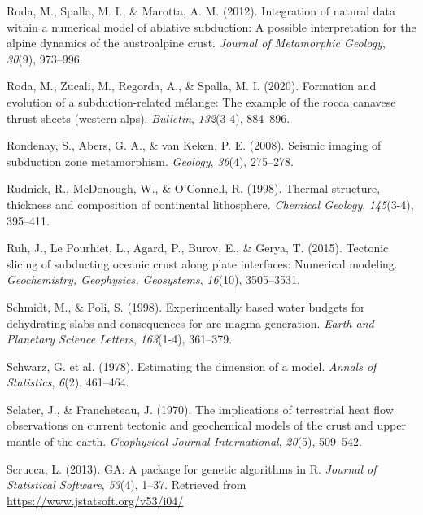 \begin{CSLReferences}{1}{1}
\leavevmode{}%
Roda, M., Spalla, M. I., \& Marotta, A. M. (2012). Integration of natural data within a numerical model of ablative subduction: A possible interpretation for the alpine dynamics of the austroalpine crust. \emph{Journal of Metamorphic Geology}, \emph{30}(9), 973--996.

\leavevmode{}%
Roda, M., Zucali, M., Regorda, A., \& Spalla, M. I. (2020). Formation and evolution of a subduction-related m{é}lange: The example of the rocca canavese thrust sheets (western alps). \emph{Bulletin}, \emph{132}(3-4), 884--896.

\leavevmode{}%
Rondenay, S., Abers, G. A., \& van Keken, P. E. (2008). Seismic imaging of subduction zone metamorphism. \emph{Geology}, \emph{36}(4), 275--278.

\leavevmode{}%
Rudnick, R., McDonough, W., \& O'Connell, R. (1998). Thermal structure, thickness and composition of continental lithosphere. \emph{Chemical Geology}, \emph{145}(3-4), 395--411.

\leavevmode{}%
Ruh, J., Le Pourhiet, L., Agard, P., Burov, E., \& Gerya, T. (2015). Tectonic slicing of subducting oceanic crust along plate interfaces: Numerical modeling. \emph{Geochemistry, Geophysics, Geosystems}, \emph{16}(10), 3505--3531.

\leavevmode{}%
Schmidt, M., \& Poli, S. (1998). Experimentally based water budgets for dehydrating slabs and consequences for arc magma generation. \emph{Earth and Planetary Science Letters}, \emph{163}(1-4), 361--379.

\leavevmode{}%
Schwarz, G. et al. (1978). Estimating the dimension of a model. \emph{Annals of Statistics}, \emph{6}(2), 461--464.

\leavevmode{}%
Sclater, J., \& Francheteau, J. (1970). The implications of terrestrial heat flow observations on current tectonic and geochemical models of the crust and upper mantle of the earth. \emph{Geophysical Journal International}, \emph{20}(5), 509--542.

\leavevmode{}%
Scrucca, L. (2013). {GA}: A package for genetic algorithms in {R}. \emph{Journal of Statistical Software}, \emph{53}(4), 1--37. Retrieved from \url{https://www.jstatsoft.org/v53/i04/}


\end{CSLReferences}
